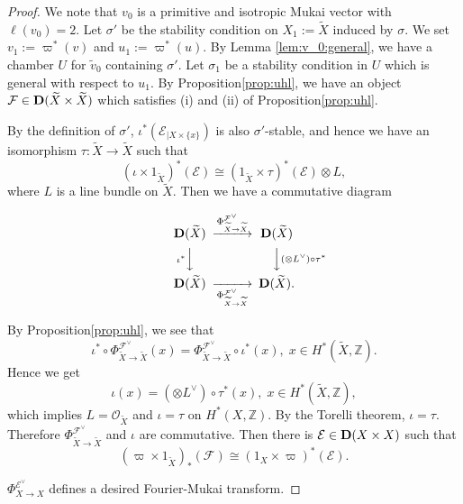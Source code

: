 \documentclass[leqno,11pt]{amsart}
\def\Z{\ensuremath{\mathbb{Z}}}
\theoremstyle{definition}
\def\Z{\ensuremath{\mathbb{Z}}}
\def\EE{\ensuremath{\mathcal E}}
\def\FF{\ensuremath{\mathcal F}}
\def\OO{\ensuremath{\mathcal O}}
\begin{document}
\begin{proof}
We note that $v_0$ is a primitive and isotropic Mukai vector with
$\ell(v_0)=2$.
Let $\sigma'$ be the stability condition on $X_1:=\widetilde{X}$
induced by $\sigma$.
We set $v_1:=\varpi^*(v)$ and $u_1:=\varpi^*(u)$.
By Lemma \ref{lem:v_0:general},
we have a chamber $U$ for $\tilde{v}_0$ containing $\sigma'$.
Let $\sigma_1$ be a stability condition in $U$
which is general
with respect to $u_1$. 
By Proposition\ref{prop:uhl}, we have an object
$\FF \in {\bf D}(\widetilde{X} \times \widetilde{X})$
which satisfies (i) and (ii) of Proposition\ref{prop:uhl}.

By the definition of $\sigma'$,
$\iota^*(\EE_{|X \times \{ x \}})$ is also $\sigma'$-stable,
and hence  
we have  
an isomorphism $\tau:\widetilde{X} \to \widetilde{X}$ 
such that
\begin{equation}
(\iota \times 1_{\widetilde{X}})^*(\EE) \cong
(1_{\widetilde{X}} \times \tau)^*(\EE) \otimes L,
\end{equation}
where $L$ is a line bundle on $\widetilde{X}$.
Then we have a commutative diagram

\begin{equation}
\begin{CD}
{\bf D}(\widetilde{X}) @>{\Phi_{\widetilde{X} \to 
\widetilde{X}}^{\FF^{\vee}}}>> {\bf D}(\widetilde{X})\\
@V{\iota^*}VV @VV{(\otimes L^{\vee}) \circ \tau^*}V \\
{\bf D}(\widetilde{X}) @>>{\Phi_{\widetilde{X} \to 
\widetilde{X}}^{\FF^{\vee}}}> {\bf D}(\widetilde{X}).\\
\end{CD}
\end{equation}

By Proposition\ref{prop:uhl}, we see that
\begin{equation}
\iota^* \circ \Phi_{\widetilde{X} \to \widetilde{X}}^{\FF^{\vee}}(x)
=\Phi_{\widetilde{X} \to \widetilde{X}}^{\FF^{\vee}} \circ \iota^*(x),\;
 x \in H^*(\widetilde{X},\Z).
\end{equation}
Hence we get
\begin{equation}
\iota(x)=(\otimes L^{\vee}) \circ \tau^*(x),\;
x \in H^*(\widetilde{X},\Z),
\end{equation}
which implies $L=\OO_{\widetilde{X}}$
and $\iota=\tau$ on $H^*(X,\Z)$.
By the Torelli theorem,
$\iota=\tau$.
Therefore $\Phi_{\widetilde{X} \to \widetilde{X}}^{\FF^{\vee}}$ and 
$\iota$ are commutative.
Then there is $\EE \in {\bf D}(X \times X)$ such that
\begin{equation}
(\varpi \times 1_{\widetilde{X}})_*(\FF)
\cong (1_X \times \varpi )^*(\EE).
\end{equation}

$\Phi_{X \to X}^{\EE^{\vee}}$ defines a desired 
Fourier-Mukai transform.
\end{proof}
\end{document}
